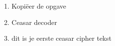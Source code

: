 \begin{enumerate}
  \item Kopi\"eer de opgave
  \item Ceasar decoder
  \item dit is je eerste ceasar cipher tekst
\end{enumerate}